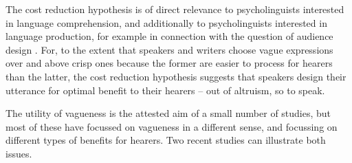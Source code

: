 \documentclass[doc,apacite]{apa6}
\begin{document}
The cost reduction hypothesis is of direct relevance to psycholinguists interested in language comprehension, and additionally to psycholinguists interested in language production, for example in connection with the question of audience design \cite{Clark1982287}. For, to the extent that speakers and writers choose vague expressions over and above crisp ones because the former are easier to process for hearers than the latter, the cost reduction hypothesis suggests that speakers design their utterance for optimal benefit to their hearers -- out of altruism, so to speak.

The utility of vagueness is the attested aim of a small number of studies, but most of these have focussed on vagueness in a different sense, and focussing on different types of benefits for hearers. Two recent studies can illustrate both issues. 
\end{document}
